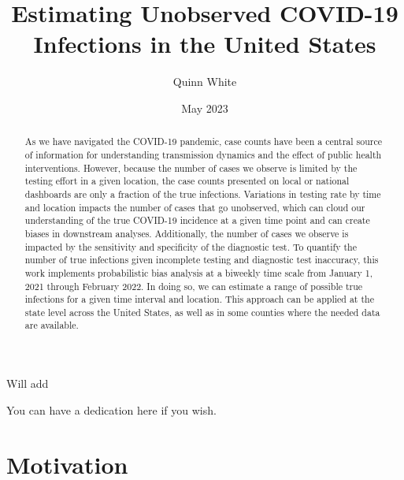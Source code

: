 \documentclass[12pt,twoside]{smiththesis}
\title{Estimating Unobserved COVID-19 Infections in the United States}
\author{Quinn White}
\date{May 2023}
\begin{document}
  \maketitle

\frontmatter %
\pagestyle{empty} %
  \begin{acknowledgements}
    Will add
  \end{acknowledgements}

  {
    \hypersetup{linkcolor=black}
    \setcounter{tocdepth}{2}
    \tableofcontents
  }


  \begin{abstract}
    As we have navigated the COVID-19 pandemic, case counts have been a central source of information for understanding transmission dynamics and the effect of public health interventions. However, because the number of cases we observe is limited by the testing effort in a given location, the case counts presented on local or national dashboards are only a fraction of the true infections. Variations in testing rate by time and location impacts the number of cases that go unobserved, which can cloud our understanding of the true COVID-19 incidence at a given time point and can create biases in downstream analyses. Additionally, the number of cases we observe is impacted by the sensitivity and specificity of the diagnostic test. To quantify the number of true infections given incomplete testing and diagnostic test inaccuracy, this work implements probabilistic bias analysis at a biweekly time scale from January 1, 2021 through February 2022. In doing so, we can estimate a range of possible true infections for a given time interval and location. This approach can be applied at the state level across the United States, as well as in some counties where the needed data are available.
  \end{abstract}
  \begin{dedication}
    You can have a dedication here if you wish.
  \end{dedication}
\mainmatter %
\pagestyle{fancyplain} %

\hypertarget{motivation}{%
\chapter{Motivation}\label{motivation}}
\end{document}
